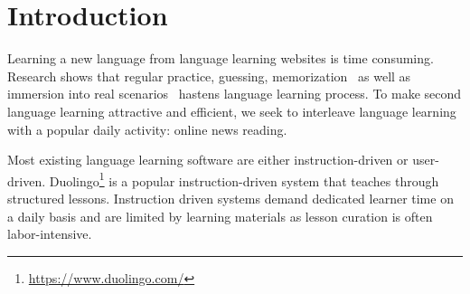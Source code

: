 \section{Introduction}
Learning a new language from language learning websites is 
time consuming. Research shows that regular practice, guessing, 
memorization~\cite{rubin75} as well as immersion into real 
scenarios~\cite{naiman78} hastens language learning process. 
To make second language learning 
attractive and efficient, we seek to interleave language learning 
with a popular daily activity: online news reading.



Most existing language learning software are either instruction-driven
or user-driven.  Duolingo\footnote{\url{https://www.duolingo.com/}} is
a popular instruction-driven system that teaches through structured
lessons.
Instruction driven systems demand dedicated learner time on a daily
basis and are limited by learning materials as lesson curation is
often labor-intensive.

